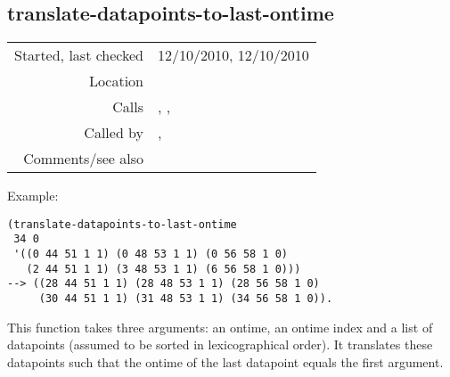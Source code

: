 \subsection*{translate-datapoints-to-last-ontime}\label{fun:translate-datapoints-to-last-ontime}

\vspace{0.3cm}
\begin{tabular}{r|p{8cm}}
Started, last checked & 12/10/2010, 12/10/2010 \\
Location & \nameref{sec:generating-beat-MNN-spacing-backwards} \\
Calls & \nameref{fun:constant-vector}, \nameref{fun:my-last}, \nameref{fun:translation} \\
Called by & \nameref{fun:generate-beat-MNN-spacing->},\newline \nameref{fun:generate-beat-spacing-forcing->} \\
Comments/see also & \nameref{fun:translate-datapoints-to-first-ontime}
\end{tabular}

\vspace{0.5cm}
\noindent Example:
\begin{verbatim}
(translate-datapoints-to-last-ontime
 34 0
 '((0 44 51 1 1) (0 48 53 1 1) (0 56 58 1 0)
   (2 44 51 1 1) (3 48 53 1 1) (6 56 58 1 0)))
--> ((28 44 51 1 1) (28 48 53 1 1) (28 56 58 1 0)
     (30 44 51 1 1) (31 48 53 1 1) (34 56 58 1 0)).
\end{verbatim}

This function takes three arguments: an ontime, an
ontime index and a list of datapoints (assumed to
be sorted in lexicographical order). It translates
these datapoints such that the ontime of the last
datapoint equals the first argument.




















